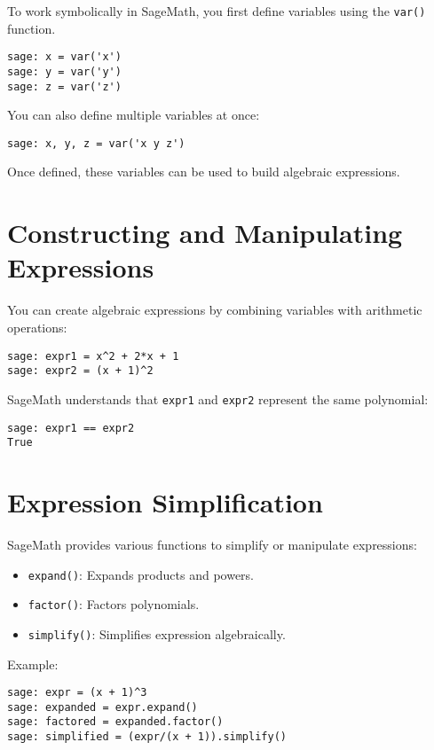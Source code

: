 \documentclass[12pt]{book}
\begin{document}
To work symbolically in SageMath, you first define variables using the \texttt{var()} function.

\begin{verbatim}
sage: x = var('x')
sage: y = var('y')
sage: z = var('z')
\end{verbatim}

You can also define multiple variables at once:

\begin{verbatim}
sage: x, y, z = var('x y z')
\end{verbatim}

Once defined, these variables can be used to build algebraic expressions.

\section{Constructing and Manipulating Expressions}

You can create algebraic expressions by combining variables with arithmetic operations:

\begin{verbatim}
sage: expr1 = x^2 + 2*x + 1
sage: expr2 = (x + 1)^2
\end{verbatim}

SageMath understands that \texttt{expr1} and \texttt{expr2} represent the same polynomial:

\begin{verbatim}
sage: expr1 == expr2
True
\end{verbatim}

\section{Expression Simplification}

SageMath provides various functions to simplify or manipulate expressions:

\begin{itemize}
  \item \texttt{expand()}: Expands products and powers.
  \item \texttt{factor()}: Factors polynomials.
  \item \texttt{simplify()}: Simplifies expression algebraically.
\end{itemize}

Example:

\begin{verbatim}
sage: expr = (x + 1)^3
sage: expanded = expr.expand()
sage: factored = expanded.factor()
sage: simplified = (expr/(x + 1)).simplify()
\end{verbatim}
\end{document}

